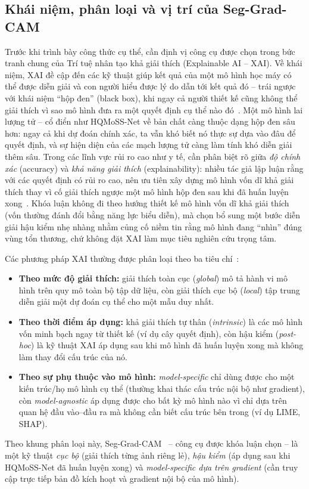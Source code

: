\subsection{Khái niệm, phân loại và vị trí của Seg-Grad-CAM}
\label{subsec:xai_taxonomy}
Trước khi trình bày công thức cụ thể, cần định vị công cụ được chọn trong bức tranh chung của Trí tuệ nhân tạo khả giải thích (Explainable AI -- XAI). Về khái niệm, XAI đề cập đến các kỹ thuật giúp kết quả của một mô hình học máy có thể được diễn giải và con người hiểu được lý do dẫn tới kết quả đó -- trái ngược với khái niệm ``hộp đen'' (black box), khi ngay cả người thiết kế cũng không thể giải thích vì sao mô hình đưa ra một quyết định cụ thể nào đó~\cite{arrieta2020xai}. Một mô hình lai lượng tử -- cổ điển như HQMoSS-Net về bản chất càng thuộc dạng hộp đen sâu hơn: ngay cả khi dự đoán chính xác, ta vẫn khó biết nó thực sự dựa vào đâu để quyết định, và sự hiện diện của các mạch lượng tử càng làm tính khó diễn giải thêm sâu. Trong các lĩnh vực rủi ro cao như y tế, cần phân biệt rõ giữa \emph{độ chính xác} (accuracy) và \emph{khả năng giải thích} (explainability): nhiều tác giả lập luận rằng với các quyết định có rủi ro cao, nên ưu tiên xây dựng mô hình vốn dĩ khả giải thích thay vì cố giải thích ngược một mô hình hộp đen sau khi đã huấn luyện xong~\cite{rudin2019blackbox}. Khóa luận không đi theo hướng thiết kế mô hình vốn dĩ khả giải thích (vốn thường đánh đổi bằng năng lực biểu diễn), mà chọn bổ sung một bước diễn giải hậu kiểm nhẹ nhàng nhằm củng cố niềm tin rằng mô hình đang ``nhìn'' đúng vùng tổn thương, chứ không đặt XAI làm mục tiêu nghiên cứu trọng tâm.

Các phương pháp XAI thường được phân loại theo ba tiêu chí~\cite{arrieta2020xai}:
\begin{itemize}
    \item \textbf{Theo mức độ giải thích:} giải thích toàn cục (\emph{global}) mô tả hành vi mô hình trên quy mô toàn bộ tập dữ liệu, còn giải thích cục bộ (\emph{local}) tập trung diễn giải một dự đoán cụ thể cho một mẫu duy nhất.
    \item \textbf{Theo thời điểm áp dụng:} khả giải thích tự thân (\emph{intrinsic}) là các mô hình vốn minh bạch ngay từ thiết kế (ví dụ cây quyết định), còn hậu kiểm (\emph{post-hoc}) là kỹ thuật XAI áp dụng sau khi mô hình đã huấn luyện xong mà không làm thay đổi cấu trúc của nó.
    \item \textbf{Theo sự phụ thuộc vào mô hình:} \emph{model-specific} chỉ dùng được cho một kiến trúc/họ mô hình cụ thể (thường khai thác cấu trúc nội bộ như gradient), còn \emph{model-agnostic} áp dụng được cho bất kỳ mô hình nào vì chỉ dựa trên quan hệ đầu vào--đầu ra mà không cần biết cấu trúc bên trong (ví dụ LIME, SHAP).
\end{itemize}
Theo khung phân loại này, Seg-Grad-CAM~\cite{vinogradova2020seggradcam} -- công cụ được khóa luận chọn -- là một kỹ thuật \emph{cục bộ} (giải thích từng ảnh riêng lẻ), \emph{hậu kiểm} (áp dụng sau khi HQMoSS-Net đã huấn luyện xong) và \emph{model-specific dựa trên gradient} (cần truy cập trực tiếp bản đồ kích hoạt và gradient nội bộ của mô hình).

